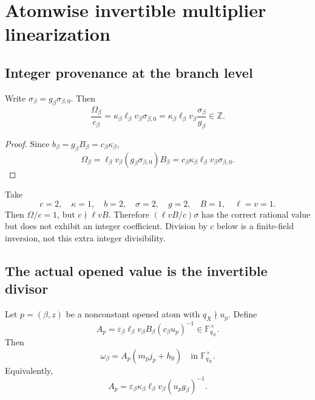 \section{Atomwise invertible multiplier linearization}
\label{sec:linearization}

\subsection{Integer provenance at the branch level}

\begin{lemma}
\label{lem:correct-integer-factorization}
Write
\(\sigma_\beta=g_\beta\sigma_{\beta,0}\).  Then
\begin{equation}
 \frac{\Omega_\beta}{c_\beta}
 =
 \kappa_\beta\ell_\beta v_\beta\sigma_{\beta,0}
 =
 \kappa_\beta\ell_\beta v_\beta
 \frac{\sigma_\beta}{g_\beta}
 \in\mathbb Z.
\label{eq:correct-integer-factorization}
\end{equation}
\end{lemma}

\begin{proof}
Since
\(b_\beta=g_\beta B_\beta=c_\beta\kappa_\beta\),
\[
 \Omega_\beta
 =
 \ell_\beta v_\beta
 (g_\beta\sigma_{\beta,0})B_\beta
 =
 c_\beta\kappa_\beta\ell_\beta
 v_\beta\sigma_{\beta,0}.
\]
\end{proof}

\begin{example}
\label{ex:no-integer-coefficient}
Take
\[
 c=2,\quad\kappa=1,\quad b=2,\quad
 \sigma=2,\quad g=2,\quad B=1,\quad\ell=v=1.
\]
Then \(\Omega/c=1\), but \(c\nmid\ell vB\).  Therefore
\((\ell vB/c)\sigma\) has the correct rational value but does not
exhibit an integer coefficient.  Division by \(c\) below is a
finite-field inversion, not this extra integer divisibility.
\end{example}

\subsection{The actual opened value is the invertible divisor}

\begin{theorem}
\label{thm:atomwise-linearization}
Let \(p=(\beta,z)\) be a nonconstant opened atom with
\(q_X\nmid u_p\).  Define
\begin{equation}
 A_p
 =
 \varepsilon_\beta\ell_\beta v_\beta B_\beta
 (c_\beta u_p)^{-1}
 \in\mathbb F_{q_X}^{\times}.
\label{eq:atom-A}
\end{equation}
Then
\begin{equation}
 \boxed{
 \omega_\beta
 =
 A_p(m_pj_p+h_0)
 \quad\text{in }\mathbb F_{q_X}^{\times}.}
\label{eq:atom-affine-omega}
\end{equation}
Equivalently,
\begin{equation}
 A_p
 =
 \varepsilon_\beta\kappa_\beta\ell_\beta v_\beta
 (u_pg_\beta)^{-1}.
\label{eq:atom-A-second}
\end{equation}
\end{theorem}

